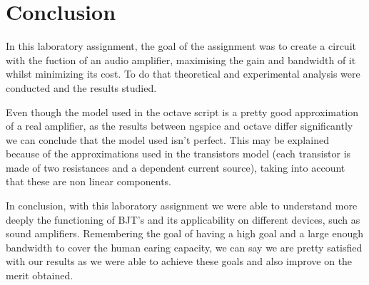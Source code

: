 \section{Conclusion}
\label{sec:conclusion}

\par In this laboratory assignment, the goal of the assignment was to create a circuit with the fuction of an audio amplifier, maximising the gain and bandwidth of it whilst minimizing its cost. To do that theoretical and experimental analysis were conducted and the results studied.

\par Even though the model used in the octave script is a pretty good approximation of a real amplifier, as the results between ngspice and octave differ significantly we can conclude that the model used isn't perfect. This may be explained because of the approximations used in the transistors model (each transistor is made of two resistances and a dependent current source), taking into account that these are non linear components. 
 
\par In conclusion, with this laboratory assignment we were able to understand more deeply the functioning of BJT's and its applicability on different devices, such as sound amplifiers. Remembering the goal of having a high goal and a large enough bandwidth to cover the human earing capacity, we can say we are pretty satisfied with our results as we were able to achieve these goals and also improve on the merit obtained.








